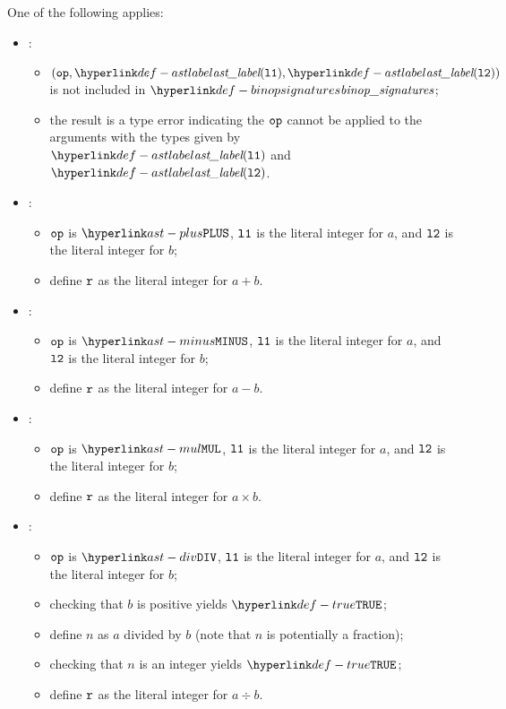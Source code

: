 \ProseParagraph
One of the following applies:
\begin{itemize}
  \item {}:
  \begin{itemize}
    \item $(\op, \astlabel(\vlone), \astlabel(\vltwo))$ is not included in $\binopsignatures$;
    \item the result is a type error indicating the $\texttt{op}$ cannot be applied to the arguments
          with the types given by $\astlabel(\vlone)$ and $\astlabel(\vltwo)$.
  \end{itemize}

  \item {}:
  \begin{itemize}
    \item $\texttt{op}$ is $\PLUS$, $\texttt{l1}$ is the literal integer for $a$, and $\texttt{l2}$ is the literal integer for $b$;
    \item define $\texttt{r}$ as the literal integer for $a+b$.
  \end{itemize}

  \item {}:
  \begin{itemize}
    \item $\texttt{op}$ is $\MINUS$, $\texttt{l1}$ is the literal integer for $a$, and $\texttt{l2}$ is the literal integer for $b$;
    \item define $\texttt{r}$ as the literal integer for $a-b$.
  \end{itemize}

  \item {}:
  \begin{itemize}
    \item $\texttt{op}$ is $\MUL$, $\texttt{l1}$ is the literal integer for $a$, and $\texttt{l2}$ is the literal integer for $b$;
    \item define $\texttt{r}$ as the literal integer for $a\times b$.
  \end{itemize}

  \item {}:
  \begin{itemize}
    \item $\texttt{op}$ is $\DIV$, $\texttt{l1}$ is the literal integer for $a$, and $\texttt{l2}$ is the literal integer for $b$;
    \item checking that $b$ is positive yields $\True$\ProseOrTypeError;
    \item define $n$ as $a$ divided by $b$ (note that $n$ is potentially a fraction);
    \item checking that $n$ is an integer yields $\True$\ProseOrTypeError;
    \item define $\texttt{r}$ as the literal integer for $a\div b$.
  \end{itemize}


\end{itemize}
